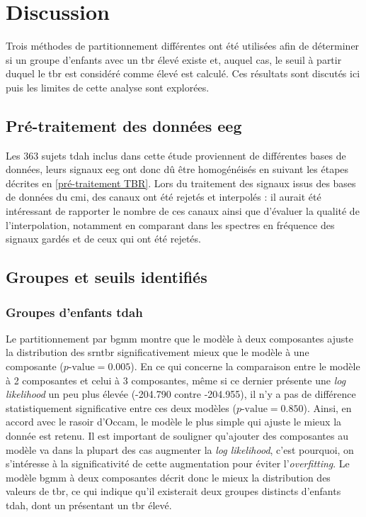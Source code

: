 \section{Discussion}

Trois méthodes de partitionnement différentes ont été utilisées afin de déterminer si un groupe d'enfants avec un \gls{tbr} élevé existe et, auquel cas, 
le seuil à partir duquel le \gls{tbr} est considéré comme élevé est calculé. Ces résultats sont discutés ici puis les limites de cette analyse sont 
explorées.

\subsection{Pré-traitement des données \gls{eeg}}

Les 363 sujets \gls{tdah} inclus dans cette étude proviennent de différentes bases de données, leurs signaux \gls{eeg} ont donc dû être homogénéisés 
en suivant les étapes décrites en \ref{pré-traitement TBR}. Lors du traitement des signaux issus des bases de données du \gls{cmi}, des canaux ont 
été rejetés et interpolés : il aurait été intéressant de rapporter le nombre de ces canaux ainsi que d'évaluer la qualité de l'interpolation, notamment 
en comparant dans les spectres en fréquence des signaux gardés et de ceux qui ont été rejetés. 

\subsection{Groupes et seuils identifiés}

\subsubsection{Groupes d'enfants \gls{tdah}}

Le partitionnement par \gls{bgmm} montre que le modèle à deux composantes ajuste la distribution des \gls{srntbr} significativement mieux que le modèle
à une composante ($p\text{-value} = 0.005$). En ce qui concerne la comparaison entre le modèle à 2 composantes et celui à 3 composantes, même si ce dernier présente 
une \textit{log likelihood} un peu plus élevée (-204.790 contre -204.955), il n'y a pas de différence statistiquement significative entre ces deux modèles ($p\text{-value}
= 0.850$). Ainsi, en accord avec le rasoir d'Occam, le modèle le plus simple qui ajuste le mieux la donnée est retenu. Il est important de souligner
qu'ajouter des composantes au modèle va dans la plupart des cas augmenter la \textit{log likelihood}, c'est pourquoi, on s'intéresse à 
la significativité de cette augmentation pour éviter l'\textit{overfitting}. Le modèle \gls{bgmm} à deux composantes décrit donc le mieux la distribution
des valeurs de \gls{tbr}, ce qui indique qu'il existerait deux groupes distincts d'enfants \gls{tdah}, dont un présentant un \gls{tbr} élevé.

